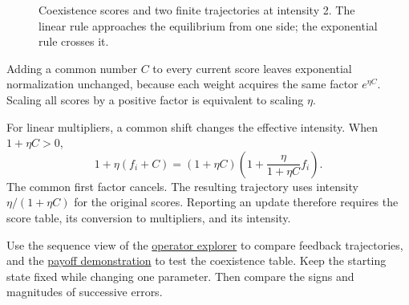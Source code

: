 \documentclass[11pt,oneside,openany]{book}
\theoremstyle{definition}
\theoremstyle{remark}
\numberwithin{equation}{chapter}
\begin{document}
\begin{figure}[htbp]\centering
{}
\caption{Coexistence scores and two finite trajectories at intensity 2. The linear rule approaches the equilibrium from one side; the exponential rule crosses it.}\end{figure}

Adding a common number \(C\) to every current score leaves exponential normalization unchanged, because each weight acquires the same factor \(e^{\eta C}\). Scaling all scores by a positive factor is equivalent to scaling \(\eta\).

For linear multipliers, a common shift changes the effective intensity. When \(1+\eta C>0\), \[1+\eta(f_i+C)=(1+\eta C)\left(1+\frac{\eta}{1+\eta C}f_i\right).\] The common first factor cancels. The resulting trajectory uses intensity \(\eta/(1+\eta C)\) for the original scores. Reporting an update therefore requires the score table, its conversion to multipliers, and its intensity.

Use the sequence view of the \href{https://bobovski66.github.io/IntroDiscreteInfoGeom/demos/operator-explorer.html}{operator explorer} to compare feedback trajectories, and the \href{https://bobovski66.github.io/IntroDiscreteInfoGeom/demos/week02.html}{payoff demonstration} to test the coexistence table. Keep the starting state fixed while changing one parameter. Then compare the signs and magnitudes of successive errors.
\end{document}
